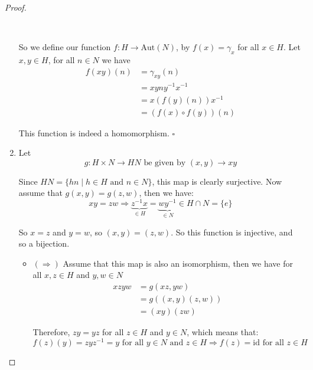 \begin{exercise}
\begin{proof}
\begin{enumerate}[label = (\alph*)]
                \

                So we define our function $f\colon H\rightarrow \text{Aut}(N)$, by $f(x) = \gamma_x$ for all $x\in H$. Let $x,y\in H$, for all $n\in N$ we have \begin{align*}
                    f(xy)(n) &= \gamma_{xy}(n)\\
                             &= xyny^{-1}x^{-1}\\
                             &= x({f(y)(n)})x^{-1}\\
                             &=({f(x)\circ f(y)})(n)
                \end{align*}

                This function is indeed a homomorphism.
                \newline $\square$
                \item Let \[g\colon H\times N\rightarrow HN \text{ be given by }(x,y) \rightarrow xy\]
                
                Since $HN = \{hn\mid h\in H\text{ and }n\in N\}$, this map is clearly surjective. Now assume that $g(x,y) = g(z,w)$, then we have:\begin{equation*}
                    xy=zw \Rightarrow \underbrace{z^{-1}x}_{\in H} = \underbrace{wy^{-1}}_{\in N}\in H \cap N = \{e\}
                \end{equation*}

                So $x=z$ and $y=w$, so $(x,y)=(z,w)$. So this function is injective, and so a bijection.

                \begin{itemize}
                    \item $(\Rightarrow)$ Assume that this map is also an isomorphism, then we have for all $x,z\in H$ and $y,w\in N$ \begin{align*}
                        xzyw &= g(xz,yw)\\
                            &= g((x,y)(z,w))\\
                            &= (xy)(zw)
                    \end{align*}
    
                    Therefore, $zy = yz$ for all $z\in H$ and $y\in N$, which means that:\begin{equation*}
                        f(z)(y) = zyz^{-1} = y \text{ for all }y\in N\text{ and }z\in H \Rightarrow f(z) = \text{id} \text{ for all }z\in H
                    \end{equation*}
    

\end{itemize}
\end{enumerate}
\end{proof}
\end{exercise}
